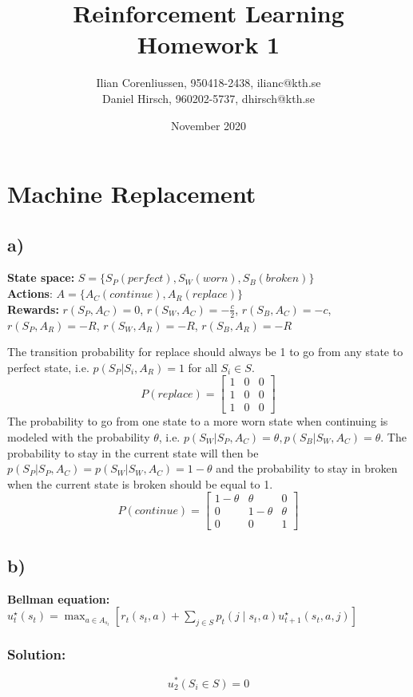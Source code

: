 \documentclass{article}
\title{Reinforcement Learning\\
       Homework 1}
\author{Ilian Corenliussen, 950418-2438, ilianc@kth.se\\ 
        Daniel Hirsch, 960202-5737, dhirsch@kth.se}
\date{November 2020}
\begin{document}
\maketitle

\section{Machine Replacement}
\subsection*{a)}
\textbf{State space:} $S = \{S_P(perfect), S_W(worn), S_B(broken)\} $\\
\textbf{Actions}: $A = \{ A_C (continue), A_R(replace) \}$\\
\textbf{Rewards:} $r(S_P,A_C) = 0$, $r(S_W,A_C) = -\frac{c}{2}$, $r(S_B,A_C) = -c$, $r(S_P, A_R) = -R$, $r(S_W, A_R) = -R$, $r(S_B, A_R) = -R$


The transition probability for replace should always be 1 to go from any state to perfect state, i.e. $p(S_P|S_i, A_R) = 1$ for all $S_i \in S$.  
\[
		P(replace) = \begin{bmatrix}
		        1 & 0 & 0 \\
		        1 & 0 & 0\\
		        1 & 0 & 0
		        \end{bmatrix}
\]
The probability to go from one state to a more worn state when continuing is modeled with the probability $\theta$, i.e. $p(S_W|S_P,A_C)=\theta, p(S_B|S_W,A_C)=\theta$. The probability to stay in the current state will then be $p(S_P|S_P,A_C)=p(S_W|S_W,A_C)=1-\theta$ and the probability to stay in broken when the current state is broken should be equal to 1.
\[
		P(continue) = \begin{bmatrix}
		        1-\theta & \theta & 0 \\
		        0 & 1-\theta & \theta\\
		        0 & 0 & 1
		        \end{bmatrix}
\]
\subsection*{b)}
\textbf{Bellman equation:} $u_{t}^{\star}\left(s_{t}\right)=\max _{a \in A_{s_{t}}}\left[r_{t}\left(s_{t}, a\right)+\sum_{j \in S} p_{t}\left(j \mid s_{t}, a\right) u_{t+1}^{\star}\left(s_{t}, a, j\right)\right]$

\subsubsection*{Solution:}
\begin{equation}
u_{2}^{*}(S_i \in S)  = 0
\end{equation}
\end{document}
